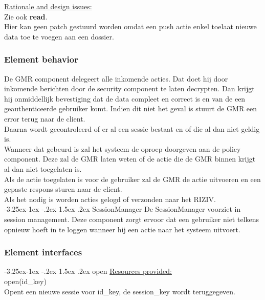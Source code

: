 \documentclass[a4paper,10pt]{book}
\makeatletter
\renewcommand\paragraph{\@startsection{paragraph}{4}{\z@}%
  {-3.25ex\@plus -1ex \@minus -.2ex}%
  {1.5ex \@plus .2ex}%
  {\normalfont\normalsize\bfseries}}
\makeatother
\begin{document}
\underline{Rationale and design issues:}\\
Zie ook \textbf{read}.\\
Hier kan geen patch gestuurd worden omdat een push actie enkel toelaat nieuwe data toe te voegen aan een dossier.

\subsubsection{Element behavior}
De GMR component delegeert alle inkomende acties.  Dat doet hij door inkomende berichten door de security component te laten decrypten.  Dan krijgt hij onmiddellijk bevestiging dat de data compleet en correct is en van de een geauthenticeerde gebruiker komt.  Indien dit niet het geval is stuurt de GMR een error terug naar de client.\\
Daarna wordt gecontroleerd of er al een sessie bestaat en of die al dan niet geldig is.\\
Wanneer dat gebeurd is zal het systeem de oproep doorgeven aan de policy component.  Deze zal de GMR laten weten of de actie die de GMR binnen krijgt al dan niet toegelaten is.\\
Als de actie toegelaten is voor de gebruiker zal de GMR de actie uitvoeren en een gepaste respons sturen naar de client.\\
Als het nodig is worden acties gelogd of verzonden naar het RIZIV.\\

\paragraph{SessionManager}
De SessionManager voorziet in session management.  Deze component zorgt ervoor dat een gebruiker niet telkens opnieuw hoeft in te loggen wanneer hij een actie naar het systeem uitvoert.

\subsubsection{Element interfaces} 

\paragraph{open}
\underline{Resources provided:}\\
open(id\_key)\\
Opent een nieuwe sessie voor id\_key, de session\_key wordt teruggegeven.
\end{document}
